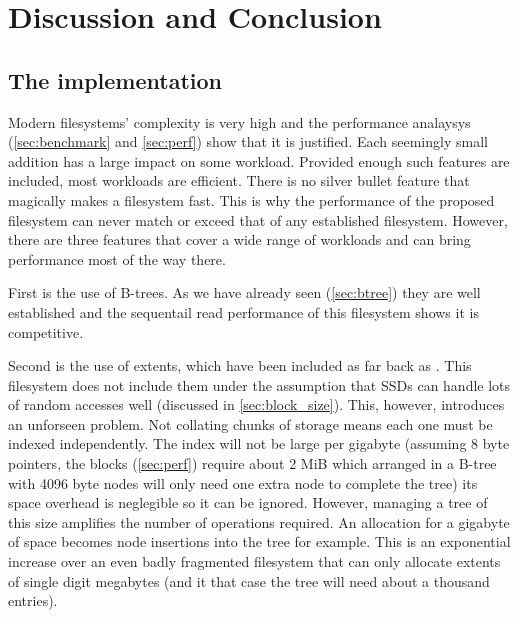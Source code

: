 \chapter{Discussion and Conclusion}

    \section{The implementation}
        \label{sec:implementation_discussion}

        Modern filesystems' complexity is very high and the performance
        analaysys (\autoref{sec:benchmark} and \autoref{sec:perf}) show that it is
        justified. Each seemingly small addition has a large impact on some
        workload. Provided enough such features are included, most workloads
        are efficient. There is no silver bullet feature that magically makes a
        filesystem fast. This is why the performance of the proposed filesystem
        can never match or exceed that of any established filesystem. However,
        there are three features that cover a wide range of workloads and can
        bring performance most of the way there.

        First is the use of B-trees. As we have already seen (\autoref{sec:btree})
        they are well established and the sequentail read performance of this
        filesystem shows it is competitive.

        Second is the use of extents, which have been included as far back as
        . This filesystem does not include them under the
        assumption that SSDs can handle lots of random accesses well (discussed
        in \autoref{sec:block_size}). This, however, introduces an unforseen
        problem. Not collating chunks of storage means each one must be indexed
        independently. The index will not be large per gigabyte (assuming 8
        byte pointers, the  blocks (\autoref{sec:perf}) require
        about 2 MiB which arranged in a B-tree with 4096 byte nodes will only
        need one extra node to complete the tree) its space overhead is
        neglegible so it can be ignored. However, managing a tree of this size
        amplifies the number of operations required. An allocation for a
        gigabyte of space becomes  node insertions into the
        tree for example. This is an exponential increase over an even badly
        fragmented filesystem that can only allocate extents of single digit
        megabytes (and it that case the tree will need about a thousand
        entries).

